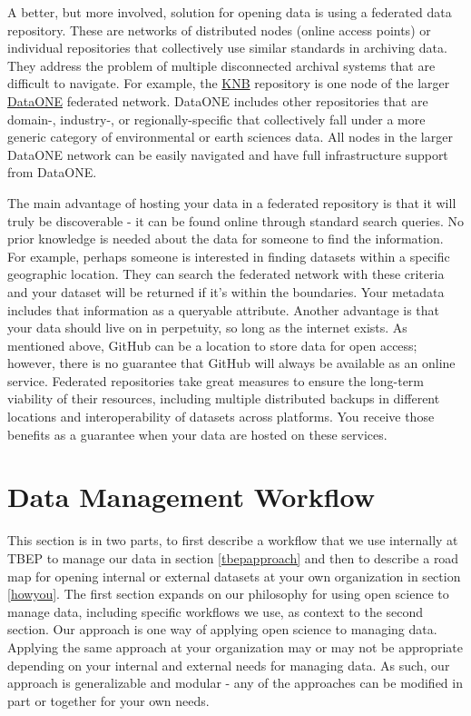 \documentclass[
]{book}
\begin{document}
A better, but more involved, solution for opening data is using a federated data repository. These are networks of distributed nodes (online access points) or individual repositories that collectively use similar standards in archiving data. They address the problem of multiple disconnected archival systems that are difficult to navigate. For example, the \href{https://knb.ecoinformatics.org/}{KNB} repository is one node of the larger \href{https://www.dataone.org/}{DataONE} federated network. DataONE includes other repositories that are domain-, industry-, or regionally-specific that collectively fall under a more generic category of environmental or earth sciences data. All nodes in the larger DataONE network can be easily navigated and have full infrastructure support from DataONE.

The main advantage of hosting your data in a federated repository is that it will truly be discoverable - it can be found online through standard search queries. No prior knowledge is needed about the data for someone to find the information. For example, perhaps someone is interested in finding datasets within a specific geographic location. They can search the federated network with these criteria and your dataset will be returned if it's within the boundaries. Your metadata includes that information as a queryable attribute. Another advantage is that your data should live on in perpetuity, so long as the internet exists. As mentioned above, GitHub can be a location to store data for open access; however, there is no guarantee that GitHub will always be available as an online service. Federated repositories take great measures to ensure the long-term viability of their resources, including multiple distributed backups in different locations and interoperability of datasets across platforms. You receive those benefits as a guarantee when your data are hosted on these services.

\hypertarget{workflow}{%
\chapter{Data Management Workflow}\label{workflow}}

This section is in two parts, to first describe a workflow that we use internally at TBEP to manage our data in section \ref{tbepapproach} and then to describe a road map for opening internal or external datasets at your own organization in section \ref{howyou}. The first section expands on our philosophy for using open science to manage data, including specific workflows we use, as context to the second section. Our approach is one way of applying open science to managing data. Applying the same approach at your organization may or may not be appropriate depending on your internal and external needs for managing data. As such, our approach is generalizable and modular - any of the approaches can be modified in part or together for your own needs.
\end{document}
